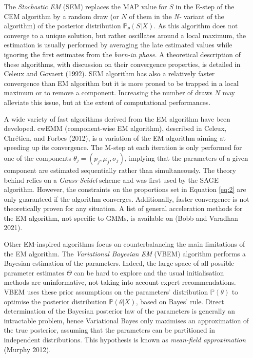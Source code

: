 The \emph{Stochastic EM} (SEM) replaces the MAP value for \(S\) in the E-step
of the CEM algorithm by a random draw (or \(N\) of them in the \emph{N-}
variant of the algorithm) of the posterior distribution
\(\mathbb{P}_\theta (S|X)\). As this algorithm does not converge to a
unique solution, but rather oscillates around a local maximum, the
estimation is usually performed by averaging the late estimated values
while ignoring the first estimates from the \emph{burn-in phase}. A
theoretical description of these algorithms, with discussion on their
convergence properties, is detailed in Celeux and Govaert (1992). SEM algorithm
has also a relatively faster convergence than EM algorithm but it is
more proned to be trapped in a local maximum or to remove a component.
Increasing the number of draws \(N\) may alleviate this issue, but at the
extent of computational performances.

A wide variety of fast algorithms derived from the EM algorithm have
been developed. cwEMM (component-wise EM algorithm), described in
Celeux, Chrétien, and Forbes (2012), is a variation of the EM algorithm aiming at speeding up
its convergence. The M-step at each iteration is only performed for one
of the components \(\theta_j=(p_j, \mu_j, \sigma_j)\), implying that the
parameters of a given component are estimated sequentially rather than
simultaneously. The theory behind relies on a \emph{Gauss-Seidel} scheme and
was first used by the SAGE algorithm. However, the constraints on the
proportions set in Equation \eqref{eq:2} are only guaranteed if the
algorithm converges. Additionally, faster convergence is not
theoretically proven for any situation. A list of general acceleration
methods for the EM algorithm, not specific to GMMs, is available on
 (Bobb and Varadhan 2021).

Other EM-inspired algorithms focus on counterbalancing the main
limitations of the EM algorithm. The \emph{Variational Bayesian EM} (VBEM)
algorithm performs a Bayesian estimation of the parameters. Indeed, the
large space of all possible parameter estimates \(\Theta\) can be hard to
explore and the usual initialisation methods are uninformative, not
taking into account expert recommendations. VBEM uses these prior
assumptions on the parameters' distribution \(\mathbb{P} (\theta)\) to
optimise the posterior distribution \(\mathbb{P} (\theta|X)\), based on
Bayes' rule. Direct determination of the Bayesian posterior law of the
parameters is generally an intractable problem, hence Variational Bayes
only maximises an approximation of the true posterior, assuming that the
parameters can be partitioned in independent distributions. This
hypothesis is known as \emph{mean-field approximation} (Murphy 2012).

